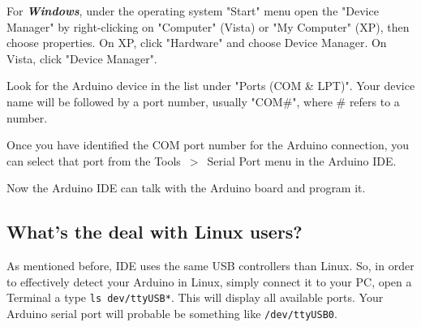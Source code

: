 For \emph{\bf{Windows}}, under the operating system "Start" menu open the "Device Manager" by right-clicking on "Computer" (Vista) or "My Computer" (XP), then choose properties. On XP, click "Hardware" and choose Device Manager. On Vista, click "Device Manager".

Look for the Arduino device in the list under "Ports (COM \& LPT)". Your device name will be followed by a port number, usually "COM\#", where \# refers to a number.

Once you have identified the COM port number for the Arduino connection, you can select that port from the Tools~$>$~Serial Port menu in the Arduino IDE.

Now the Arduino IDE can talk with the Arduino board and program it.

\subsection{What's the deal with Linux users?}
As mentioned before, IDE uses the same USB controllers than Linux. So, in order to effectively detect your Arduino in Linux, simply connect it to your PC, open a Terminal a type \texttt{ls dev/ttyUSB*}. This will display all available ports. Your Arduino serial port will probable be something like \texttt{/dev/ttyUSB0}.
